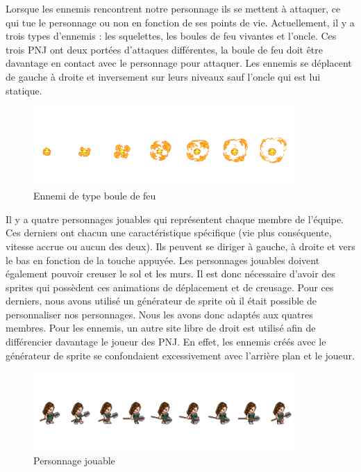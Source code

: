\documentclass[a4paper,12pt]{article}
\begin{document}
Lorsque les ennemis rencontrent notre personnage ils se mettent à attaquer, ce qui tue le personnage ou non en fonction de ses points de vie. 
Actuellement, il y a trois types d’ennemis : les squelettes, les boules de feu vivantes et l'oncle. 
Ces trois PNJ ont deux portées d’attaques différentes, la boule de feu doit être davantage en contact avec le personnage pour attaquer.
Les ennemis se déplacent de gauche à droite et inversement sur leurs niveaux sauf l'oncle qui est lui statique. 

\begin{figure}[h]
	\centering
	\includegraphics[height=3cm]{img/exemple_feu.png}
	\caption{Ennemi de type boule de feu}
	\label{boule de feu}
\end{figure}

Il y a quatre personnages jouables qui représentent chaque membre de l’équipe. 
Ces derniers ont chacun une caractéristique spécifique (vie plus conséquente, vitesse accrue ou aucun des deux). 
Ils peuvent se diriger à gauche, à droite et vers le bas en fonction de la touche appuyée. 
Les personnages jouables doivent également pouvoir creuser le sol et les murs. Il est donc nécessaire d’avoir des sprites qui possèdent ces animations de déplacement et de creusage.
Pour ces derniers, nous avons utilisé un générateur de sprite où il était possible de personnaliser nos personnages. Nous les avons donc adaptés aux quatres membres. 
Pour les ennemis, un autre site libre de droit est utilisé afin de différencier davantage le joueur des PNJ. En effet, les ennemis créés avec le générateur de sprite se confondaient excessivement avec l'arrière plan et le joueur.

\begin{figure}[h]
	\centering
	\includegraphics[height=3cm]{img/exemple_personnage_jouable.png}
	\caption{Personnage jouable}
	\label{personnage jouable}
\end{figure}
\end{document}
